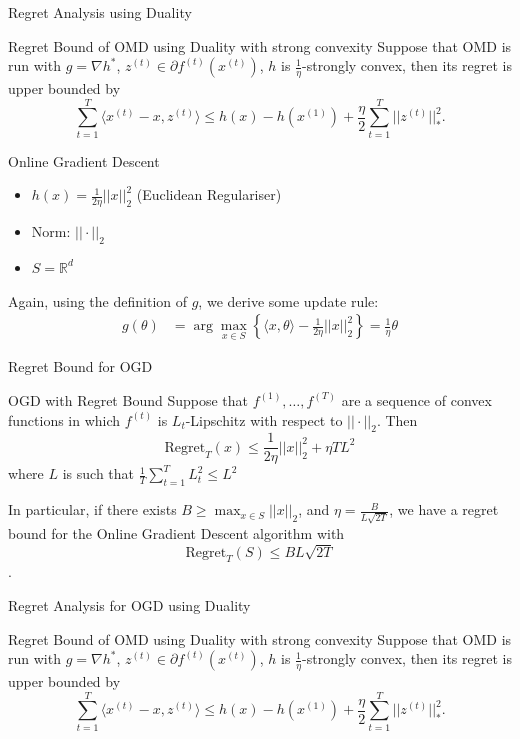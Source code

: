 \begin{frame}{Regret Analysis using Duality}
\begin{block}{Regret Bound of OMD using Duality with strong convexity}
        Suppose that OMD is run with $g = \nabla h^*$, $z^{(t)} \in \partial f^{(t)}(x^{(t)})$, $h$ is $\frac{1}{\eta}$-strongly convex, then its regret is upper bounded by
        $$
        \sum_{t=1}^T\langle x^{(t)} - x, z^{(t)} \rangle \leq h(x) - h(x^{(1)}) + \frac{\eta}{2}\sum_{t=1}^T ||z^{(t)}||^2_*.
        $$
    \end{block}
\end{frame}

\begin{frame}{Online Gradient Descent}
    \begin{itemize}
    \item $h(x) = \frac{1}{2\eta}||x||_2^2$ (Euclidean Regulariser)
    \item Norm: $||\cdot||_2$
    \item $S = \mathbb{R}^d$
\end{itemize}
Again, using the definition of $g$, we derive some update rule:
\begin{align*}
    g(\theta) &= \arg\max_{x \in S} \left\{\langle x, \theta\rangle - \frac{1}{2\eta}||x||_2^2\right\} = \frac{1}{\eta}\theta
\end{align*}
\end{frame}

\begin{frame}{Regret Bound for OGD}
    \begin{block}{OGD with Regret Bound}
    Suppose that $f^{(1)}, \ldots, f^{(T)}$ are a sequence of convex functions in which $f^{(t)}$ is $L_t$-Lipschitz with respect to $||\cdot||_2$. Then
    \begin{equation*}
        \text{Regret}_T(x) \leq \frac{1}{2\eta}||x||_2^2 + \eta TL^2
    \end{equation*}
    where $L$ is such that $\frac{1}{T}\sum_{t=1}^TL_t^2 \leq L^2$
\end{block}
In particular, if there exists $B \geq \max_{x \in S}||x||_2$, and $\eta = \frac{B}{L\sqrt{2T}}$, we have a regret bound for the Online Gradient Descent algorithm with 
$$\text{Regret}_T(S) \leq BL \sqrt{2T}$$.
\end{frame}

\begin{frame}{Regret Analysis for OGD using Duality}
\begin{block}{Regret Bound of OMD using Duality with strong convexity}
        Suppose that OMD is run with $g = \nabla h^*$, $z^{(t)} \in \partial f^{(t)}(x^{(t)})$, $h$ is $\frac{1}{\eta}$-strongly convex, then its regret is upper bounded by
        $$
        \sum_{t=1}^T\langle x^{(t)} - x, z^{(t)} \rangle \leq h(x) - h(x^{(1)}) + \frac{\eta}{2}\sum_{t=1}^T ||z^{(t)}||^2_*.
        $$
    \end{block}
\end{frame}


